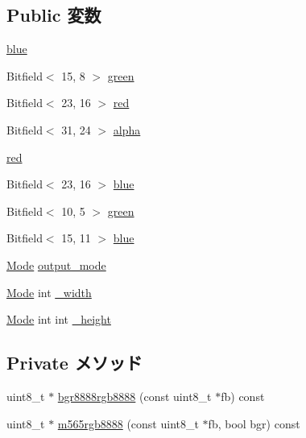 \subsection*{Public 変数}
\begin{DoxyCompactItemize}
\item 
\hyperlink{classVideoConvert_a101bdda76d2a3f9c9ddf0e1eae8aec57}{blue}
\item 
Bitfield$<$ 15, 8 $>$ \hyperlink{classVideoConvert_a43eec3e5c29440fd3331f944c534e1e5}{green}
\item 
Bitfield$<$ 23, 16 $>$ \hyperlink{classVideoConvert_ad49a87cd83e7b5cf018907f2ab2ac4b2}{red}
\item 
Bitfield$<$ 31, 24 $>$ \hyperlink{classVideoConvert_acc646c96f4c3628ae271f41ed0bce273}{alpha}
\item 
\hyperlink{classVideoConvert_a42c3a4a0281e61ee592e36a3eda020f2}{red}
\item 
Bitfield$<$ 23, 16 $>$ \hyperlink{classVideoConvert_a3f662f1a76eee8aed8b7174927b8492b}{blue}
\item 
Bitfield$<$ 10, 5 $>$ \hyperlink{classVideoConvert_a0a98f2d8a76a5e0ed2f25bf2e14bfce2}{green}
\item 
Bitfield$<$ 15, 11 $>$ \hyperlink{classVideoConvert_ab004367fe9bab206cd9739e2272faea7}{blue}
\item 
\hyperlink{classVideoConvert_a46c8a310cf4c094f8c80e1cb8dc1f911}{Mode} \hyperlink{classVideoConvert_ade2cdeada5ed99044e79b262d445f5e8}{output\_\-mode}
\item 
\hyperlink{classVideoConvert_a46c8a310cf4c094f8c80e1cb8dc1f911}{Mode} int \hyperlink{classVideoConvert_ac2e18daf71d4a975e321c0a67a3f3b6e}{\_\-width}
\item 
\hyperlink{classVideoConvert_a46c8a310cf4c094f8c80e1cb8dc1f911}{Mode} int int \hyperlink{classVideoConvert_acd9c3d3bbf1866dfc4287c23d6b5ba33}{\_\-height}
\end{DoxyCompactItemize}
\subsection*{Private メソッド}
\begin{DoxyCompactItemize}
\item 
uint8\_\-t $\ast$ \hyperlink{classVideoConvert_a2d9e7d7d1a3dccee4b57b721fb90e909}{bgr8888rgb8888} (const uint8\_\-t $\ast$fb) const 
\item 
uint8\_\-t $\ast$ \hyperlink{classVideoConvert_adfe496e35ca2a33e332b0a1874ef21fa}{m565rgb8888} (const uint8\_\-t $\ast$fb, bool bgr) const 
\end{DoxyCompactItemize}
